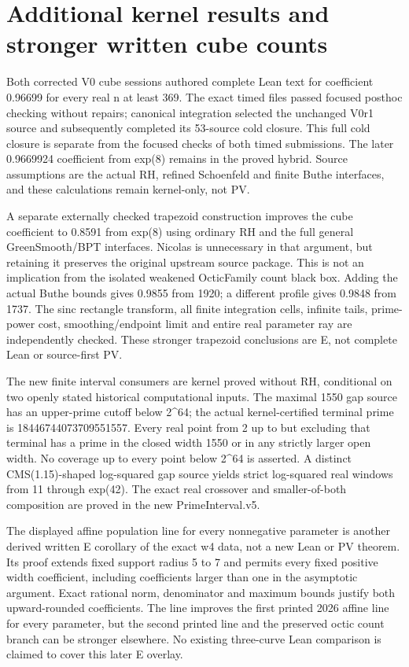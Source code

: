 \documentclass[11pt]{article}
\begin{document}
\section{Additional kernel results and stronger written cube counts}

Both corrected V0 cube sessions authored complete Lean text for coefficient 0.96699 for every real n at least 369. The exact timed files passed focused posthoc checking without repairs; canonical integration selected the unchanged V0r1 source and subsequently completed its 53-source cold closure. This full cold closure is separate from the focused checks of both timed submissions. The later 0.9669924 coefficient from exp(8) remains in the proved hybrid. Source assumptions are the actual RH, refined Schoenfeld and finite Buthe interfaces, and these calculations remain kernel-only, not PV.


A separate externally checked trapezoid construction improves the cube coefficient to 0.8591 from exp(8) using ordinary RH and the full general GreenSmooth/BPT interfaces. Nicolas is unnecessary in that argument, but retaining it preserves the original upstream source package. This is not an implication from the isolated weakened OcticFamily count black box. Adding the actual Buthe bounds gives 0.9855 from 1920; a different profile gives 0.9848 from 1737. The sinc rectangle transform, all finite integration cells, infinite tails, prime-power cost, smoothing/endpoint limit and entire real parameter ray are independently checked. These stronger trapezoid conclusions are E, not complete Lean or source-first PV.


The new finite interval consumers are kernel proved without RH, conditional on two openly stated historical computational inputs. The maximal 1550 gap source has an upper-prime cutoff below 2\textasciicircum{}64; the actual kernel-certified terminal prime is 18446744073709551557. Every real point from 2 up to but excluding that terminal has a prime in the closed width 1550 or in any strictly larger open width. No coverage up to every point below 2\textasciicircum{}64 is asserted. A distinct CMS(1.15)-shaped log-squared gap source yields strict log-squared real windows from 11 through exp(42). The exact real crossover and smaller-of-both composition are proved in the new PrimeInterval.v5.


The displayed affine population line for every nonnegative parameter is another derived written E corollary of the exact w4 data, not a new Lean or PV theorem. Its proof extends fixed support radius 5 to 7 and permits every fixed positive width coefficient, including coefficients larger than one in the asymptotic argument. Exact rational norm, denominator and maximum bounds justify both upward-rounded coefficients. The line improves the first printed 2026 affine line for every parameter, but the second printed line and the preserved octic count branch can be stronger elsewhere. No existing three-curve Lean comparison is claimed to cover this later E overlay.
\end{document}
